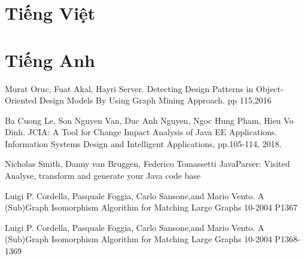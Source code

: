 \documentclass[12pt]{report}
\begin{document}
\begin{thebibliography}{9}
	\section*{Tiếng Việt}
	\section*{Tiếng Anh}
	 Murat Oruc, Fuat Akal, Hayri Server. Detecting Design Patterns in  Object-Oriented Design Models By Using Graph Mining Approach. pp 115,2016
	
	Ba Cuong Le, Son Nguyen Van, Duc Anh Nguyen, Ngoc Hung Pham, Hieu Vo Dinh. JCIA: A Tool for Change Impact Analysis of Java EE Applications. Information Systems Design and Intelligent Applications, pp.105-114, 2018.
	
	Nicholas Smith, Danny van Bruggen, Federico Tomassetti
	JavaParser: Visited
	Analyse, transform and generate your Java code base
	
	Luigi P. Cordella, Pasquale Foggia, Carlo Sansone,and Mario Vento. A (Sub)Graph Isomorphism Algorithm for
	Matching Large Graphs 10-2004 P1367
	
	Luigi P. Cordella, Pasquale Foggia, Carlo Sansone,and Mario Vento. A (Sub)Graph Isomorphism Algorithm for
	Matching Large Graphs 10-2004 P1368-1369
\end{thebibliography}
\end{document}
